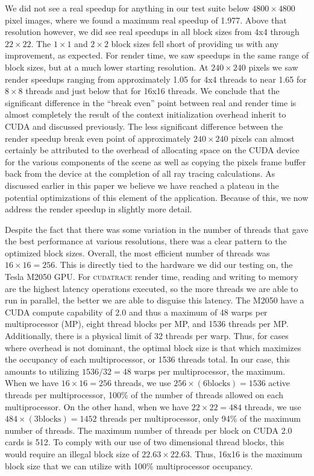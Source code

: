 \documentclass[12pt]{article}
\begin{document}
We did not see a real speedup for anything in our test suite below $4800 \times 4800$ pixel images, where we found a maximum real speedup of 1.977. Above that resolution however, we did see real speedups in all block sizes from 4x4 through $22 \times 22$. The $1 \times 1$ and $2 \times 2$ block sizes fell short of providing us with any improvement, as expected. For render time, we saw speedups in the same range of block sizes, but at a much lower starting resolution. At $240 \times 240$ pixels we saw render speedups ranging from approximately 1.05 for 4x4 threads to near 1.65 for $8 \times 8$ threads and just below that for 16x16 threads. We conclude that the significant difference in the ``break even'' point between real and render time is almost completely the result of the context initialization overhead inherit to CUDA and discussed previously. The less significant difference between the render speedup break even point of approximately $240 \times 240$ pixels can almost certainly be attributed to the overhead of allocating space on the CUDA device for the various components of the scene as well as copying the pixels frame buffer back from the device at the completion of all ray tracing calculations. As discussed earlier in this paper we believe we have reached a plateau in the potential optimizations of this element of the application. Because of this, we now address the render speedup in slightly more detail.

Despite the fact that there was some variation in the number of threads that gave the best performance at various resolutions, there was a clear pattern to the optimized block sizes. Overall, the most efficient number of threads was $16 \times 16 = 256$. This is directly tied to the hardware we did our testing on, the Tesla M2050 GPU. For \textsc{cudatrace} render time, reading and writing to memory are the highest latency operations executed, so the more threads we are able to run in parallel, the better we are able to disguise this latency. The M2050 have a CUDA compute capability of 2.0 and thus a maximum of 48 warps per multiprocessor (MP), eight thread blocks per MP, and 1536 threads per MP. Additionally, there is a physical limit of 32 threads per warp. Thus, for cases where overhead is not dominant, the optimal block size is that which maximizes the occupancy of each multiprocessor, or 1536 threads total.  In our case, this amounts to utilizing $1536/32 = 48$ warps per multiprocessor, the maximum. When we have $16 \times 16 = 256$ threads, we use $256 \times (6 \text{blocks}) = 1536$ active threads per multiprocessor, 100\% of the number of threads allowed on each multiprocessor. On the other hand, when we have $22 \times 22 = 484$ threads, we use $484 \times (3 \text{blocks}) = 1452$ threads per multiprocessor, only 94\% of the maximum number of threads. The maximum number of threads per block on CUDA 2.0 cards is 512. To comply with our use of two dimensional thread blocks, this would require an illegal block size of $22.63 \times 22.63$. Thus, 16x16 is the maximum block size that we can utilize with 100\% multiprocessor occupancy.
\end{document}
